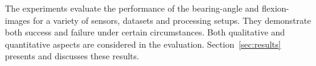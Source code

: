 The experiments evaluate the performance of the \gls{bearing-angle} and \glspl{flexion-image} for a variety of sensors, datasets and processing setups.
They demonstrate both success and failure under certain circumstances.
Both qualitative and quantitative aspects are considered in the evaluation.
Section~\ref{sec:results} presents and discusses these results.
